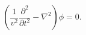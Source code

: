 \begin{equation}
\left(\frac{1}{v^{2}}\frac{\partial^{2}}{\partial t^{2}}-\nabla^{2}\right)
\phi=0.
\end{equation} 
